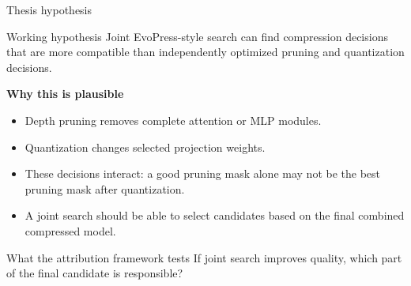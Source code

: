 \documentclass[aspectratio=169]{beamer}
\begin{document}
\begin{frame}{Thesis hypothesis}
\begin{block}{Working hypothesis}
Joint EvoPress-style search can find compression decisions that are more compatible than independently optimized pruning and quantization decisions.
\end{block}

\vspace{0.25cm}
\textbf{Why this is plausible}
\begin{itemize}
    \item Depth pruning removes complete attention or MLP modules.
    \item Quantization changes selected projection weights.
    \item These decisions interact: a good pruning mask alone may not be the best pruning mask after quantization.
    \item A joint search should be able to select candidates based on the final combined compressed model.
\end{itemize}

\vspace{0.2cm}
\begin{block}{What the attribution framework tests}
If joint search improves quality, which part of the final candidate is responsible?
\end{block}
\end{frame}

\end{document}
